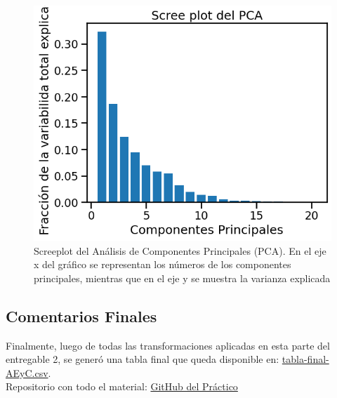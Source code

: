 \begin{figure} [!t]
\begin{center}
\includegraphics[width=0.6\columnwidth]{img/PCA.png}
\caption{Screeplot del Análisis de Componentes Principales (PCA). En el eje x del gráfico se representan los números de los componentes principales, mientras que en el eje y se muestra la varianza explicada}
\label{pca}
\end{center}
\end{figure}


\subsection*{Comentarios Finales}
Finalmente, luego de todas las transformaciones aplicadas en esta parte del entregable 2, se generó una tabla final que queda disponible en: \href{
https://raw.githubusercontent.com/sebascoca/DiploDatos2023/main/AnalisisYCuracion/Practico/tablafinalAEyC.csv}{tabla-final-AEyC.csv}. \\[.5cm]

Repositorio con todo el material: \href{https://github.com/sebascoca/DiploDatos2023/tree/main/AnalisisYCuracion/Practico}{GitHub del Práctico}









